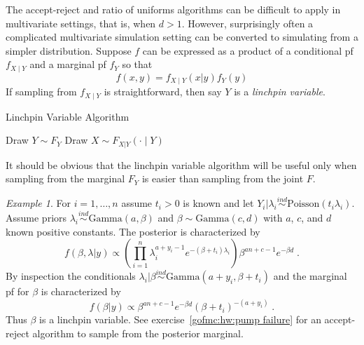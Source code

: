 \documentclass[12pt]{article}
\theoremstyle{plain}
\theoremstyle{definition}
\theoremstyle{remark}
\newtheorem{example}{Example}[section]
\begin{document}
The accept-reject and ratio of uniforms algorithms can be difficult to
apply in multivariate settings, that is, when $d > 1$. However,
surprisingly often a complicated multivariate simulation setting can
be converted to simulating from a simpler distribution.  Suppose $f$
can be expressed as a product of a conditional pf $f_{X \mid Y}$ and
a marginal pf $f_{Y}$ so that
\[
f(x, y) = f_{X \mid Y}(x|y) f_{Y}(y)
\]
If sampling from $f_{X \mid Y}$ is straightforward, then say $Y$ is a
{\em linchpin variable}.

\begin{algorithm}[H]
 \caption{Linchpin Variable Algorithm} \label{gofmc:alg:lv}
 \begin{algorithmic}[1]
   \State Draw $Y \sim F_Y$ 
   \State Draw $X \sim F_{X|Y}(\cdot \mid Y)$
 \end{algorithmic}
\end{algorithm}

It should be obvious that the linchpin variable algorithm will be
useful only when sampling from the marginal $F_Y$ is easier than
sampling from the joint $F$.

\begin{example}
\label{gofmc:ex:pump failure}
For $i=1, \ldots, n$ assume $t_i > 0$ is known and let
$Y_{i} | \lambda_i \stackrel{ind}{\sim} \text{Poisson}(t_i
\lambda_i)$.  Assume priors
$\lambda_i \stackrel{ind}{\sim} \text{Gamma}(a, \beta)$ and
$\beta \sim \text{Gamma}(c, d)$ with $a$, $c$, and $d$ known positive
constants. The posterior is characterized by
$$
f(\beta, \lambda |y) \propto \left( \prod_{i=1}^{n} \lambda_{i}^{a +
    y_i - 1} e^{-(\beta+ t_i)\lambda_i}\right) \beta^{an+c-1}
e^{-\beta d} \; .
$$
By inspection the conditionals
$\lambda_i | \beta \stackrel{ind}{\sim} \text{Gamma}(a+y_i, \beta +
t_i)$ and the marginal pf for $\beta$ is characterized by
$$
f(\beta | y) \propto \beta^{an+c-1} e^{-\beta d} \left( \beta + t_i
\right)^{-(a+y_i)} \; .
$$
Thus $\beta$ is a linchpin variable. See exercise~\ref{gofmc:hw:pump
  failure} for an accept-reject algorithm to sample from the posterior
marginal.
\end{example}
\end{document}
